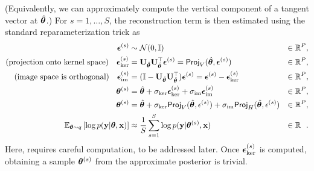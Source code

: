 (Equivalently, we can approximately compute the vertical component of a tangent vector at \(\hat{\bm{\theta}}\).)
For \(s=1,\ldots,S\), the reconstruction term is then estimated using the standard reparameterization trick as
\begin{align}
  \bm{\epsilon}^{(s)}   &\sim \mathcal{N}(0, \mathbb{I})
                   & \in \mathbb{R}^P, \\
  \text{(projection onto kernel space)} \quad
  \bm{\epsilon}_{\ker}^{(s)} &= \mathbf{U}_{\hat{\bm{\theta}}}\mathbf{U}_{\hat{\bm{\theta}}}^{\top} \bm{\epsilon}^{(s)} = \textsf{Proj}_V(\hat{\bm{\theta}}, \bm{\epsilon}^{(s)})
                   & \in \mathbb{R}^P, \label{eq:kernel-projection}\\
  \text{(image space is orthogonal)} \quad
  \bm{\epsilon}_{\operatorname{im}}^{(s)} &= (\mathbb{I} - \mathbf{U}_{\hat{\bm{\theta}}}\mathbf{U}_{\hat{\bm{\theta}}}^{\top}) \bm{\epsilon}^{(s)} = \bm{\epsilon}^{(s)} - \bm{\epsilon}_{\ker}^{(s)}
                   & \in \mathbb{R}^P, \\
  \bm{\theta}^{(s)}     &= \hat{\bm{\theta}} + \sigma_{\ker} \bm{\epsilon}_{\ker}^{(s)} + \sigma_{\operatorname{im}} \bm{\epsilon}_{\operatorname{im}}^{(s)}
                   & \in \mathbb{R}^P, \\
  \bm{\theta}^{(s)}     &= \hat{\bm{\theta}} + \sigma_{\ker} \textsf{Proj}_V(\hat{\bm{\theta}} ,\epsilon^{(s)}) + \sigma_{\operatorname{im}}  \textsf{Proj}_H(\hat{\bm{\theta}} ,\epsilon^{(s)})
                   & \in \mathbb{R}^P, \\
  \mathbb{E}_{\bm{\theta} \sim q}\left[ \log p(\mathbf{y} | \bm{\theta}, \mathbf{x}) \right]
                   &\approx \frac{1}{S} \sum_{s=1}^S \log p(\mathbf{y} | \bm{\theta}^{(s)}, \mathbf{x})
                   & \in \mathbb{R}\phantom{^P} \label{eq:elbo-expectation}.
\end{align}
Here,  requires careful computation, to be addressed later.
Once $\bm{\epsilon}_{\ker}^{(s)}$ is computed, obtaining a sample $\bm{\theta}^{(s)}$ from the approximate posterior is trivial.

